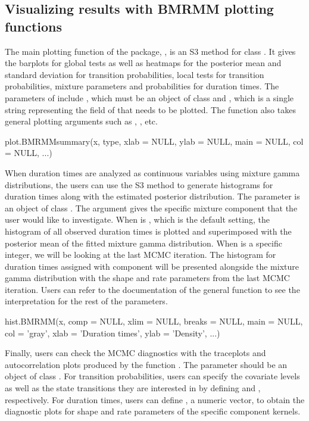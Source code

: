 \subsection{Visualizing results with BMRMM plotting functions}

The main plotting function of the package, , is an S3 method  for class .  
It gives the barplots for global tests as well as heatmaps for the posterior mean and standard deviation for transition probabilities, local tests for transition probabilities,  mixture parameters and probabilities for duration times. 
The parameters of  include , which must be an object of class  and , which is a single string representing the field of  that needs to be plotted. 
The function also takes general plotting arguments such as , , etc.   

\begin{example}
plot.BMRMMsummary(x, type, xlab = NULL, ylab = NULL, main = NULL, col = NULL, ...)
\end{example}

When duration times are analyzed as continuous variables using mixture gamma distributions, 
the users can use the S3 method   to generate histograms for duration times along with the estimated posterior distribution.
The parameter  is an object of class . 
The argument  gives the specific mixture component that the user would like to investigate. 
When  is , which is the default setting,  the histogram of all observed {duration times} is plotted and superimposed with the posterior mean of the fitted mixture gamma distribution.
When  is a specific integer,  we will be looking at the last MCMC iteration. 
The histogram for duration times assigned with component  will be presented alongside the mixture gamma distribution with the shape and rate parameters from the last MCMC iteration. 
Users can refer to the documentation of the general  function to see the interpretation for the rest of the parameters. 


\begin{example}
hist.BMRMM(x, comp = NULL, xlim = NULL, breaks = NULL, main = NULL, 
           col = 'gray', xlab = 'Duration times', ylab = 'Density', ...)
\end{example}


Finally,  users can check the MCMC diagnostics with the traceplots and autocorrelation plots produced by the function .
The  parameter should be an object of class . 
For  transition probabilities,  users can specify the covariate levels as well as the state transitions they are interested in by defining  and , respectively. 
For duration times, 
users can define  , a numeric vector,  to obtain the diagnostic plots for shape and rate parameters of the specific component kernels. 

